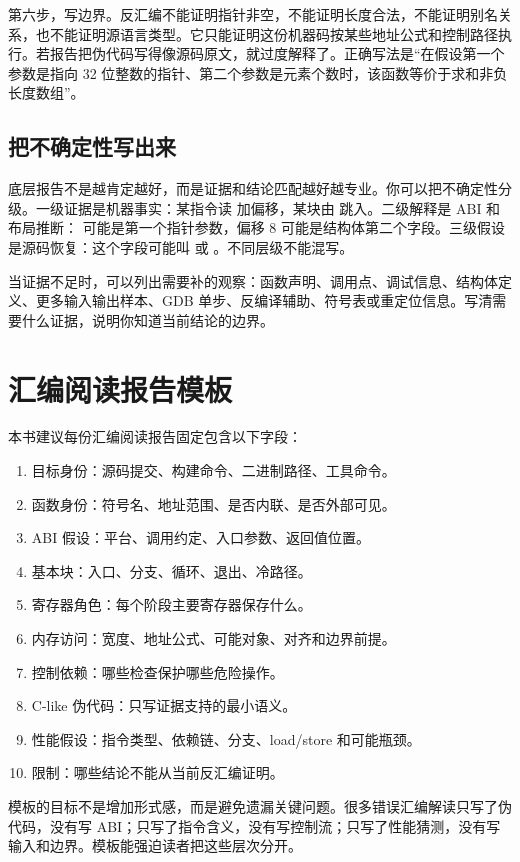 第六步，写边界。反汇编不能证明指针非空，不能证明长度合法，不能证明别名关系，也不能证明源语言类型。它只能证明这份机器码按某些地址公式和控制路径执行。若报告把伪代码写得像源码原文，就过度解释了。正确写法是“在假设第一个参数是指向 32 位整数的指针、第二个参数是元素个数时，该函数等价于求和非负长度数组”。

\subsection{把不确定性写出来}

底层报告不是越肯定越好，而是证据和结论匹配越好越专业。你可以把不确定性分级。一级证据是机器事实：某指令读  加偏移，某块由  跳入。二级解释是 ABI 和布局推断： 可能是第一个指针参数，偏移 8 可能是结构体第二个字段。三级假设是源码恢复：这个字段可能叫  或 。不同层级不能混写。

当证据不足时，可以列出需要补的观察：函数声明、调用点、调试信息、结构体定义、更多输入输出样本、GDB 单步、反编译辅助、符号表或重定位信息。写清需要什么证据，说明你知道当前结论的边界。

\section{汇编阅读报告模板}

本书建议每份汇编阅读报告固定包含以下字段：

\begin{enumerate}
  \item 目标身份：源码提交、构建命令、二进制路径、工具命令。
  \item 函数身份：符号名、地址范围、是否内联、是否外部可见。
  \item ABI 假设：平台、调用约定、入口参数、返回值位置。
  \item 基本块：入口、分支、循环、退出、冷路径。
  \item 寄存器角色：每个阶段主要寄存器保存什么。
  \item 内存访问：宽度、地址公式、可能对象、对齐和边界前提。
  \item 控制依赖：哪些检查保护哪些危险操作。
  \item C-like 伪代码：只写证据支持的最小语义。
  \item 性能假设：指令类型、依赖链、分支、load/store 和可能瓶颈。
  \item 限制：哪些结论不能从当前反汇编证明。
\end{enumerate}

模板的目标不是增加形式感，而是避免遗漏关键问题。很多错误汇编解读只写了伪代码，没有写 ABI；只写了指令含义，没有写控制流；只写了性能猜测，没有写输入和边界。模板能强迫读者把这些层次分开。

